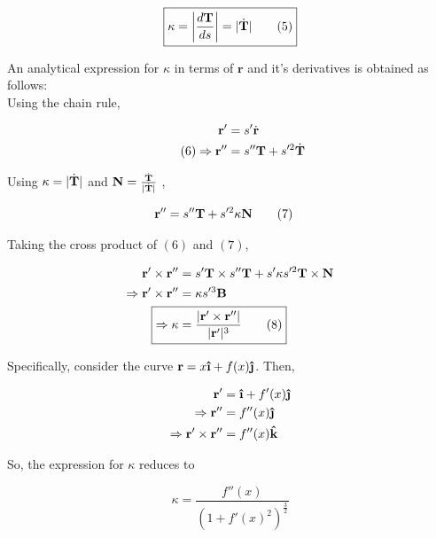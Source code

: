 \documentclass{article}
\begin{document}
\begin{flushleft}
     \begin{equation*}
     \boxed{\kappa = \displaystyle\left\lvert \frac{d\mathbf{T}}{ds} \right\rvert = \lvert \dot{\mathbf{T}} \rvert \tag{5}}
     \end{equation*}
     
     An analytical expression for $\kappa$ in terms of $\mathbf{r}$ and it's derivatives is obtained as follows:\\
     Using the chain rule, 
     
     \begin{align*}    
	\mathbf{r'} &= s'\dot{\mathbf{r}}\\\tag{6}
	\Rightarrow \mathbf{r''} &= s''\mathbf{T}+s'^{2}\dot{\mathbf{T}}
     \end{align*}
     
     Using $\kappa= \lvert \dot{\mathbf{T}} \rvert$ and $\mathbf{N} = \frac{\dot{\mathbf{T}}}{ \lvert \dot{\mathbf{T}} \rvert}$
     ,
     
     \begin{align*}
     \mathbf{r''} &= s''\mathbf{T}+s'^{2}\kappa\mathbf{N}\tag{7}
     \end{align*}
     
     Taking the cross product of $(6)$ and $(7)$,
     
     \begin{align*}
     \vect{r'} \times \vect{r''} &= s'\mathbf{T} \times s''\vect{T} + s' \kappa s'^{2}\vect{T} \times \vect{N}\\
     \Rightarrow \vect{r'} \times \vect{r''} &= \kappa s'^{3} \vect{B}\\
     \Aboxed{\Rightarrow \kappa &= \frac{\Mod{\vect{r'} \times \vect{r''}}}{\Mod{\vect{r'}}^{3}}\tag{8}}
     \end{align*}
     
     Specifically,  consider the curve $ \vect{r} = x\uveci + f(x)\uvecj$. Then,  
     
     \begin{align*}
     \vect{r'} & = \uveci + f'(x)\uvecj \\
     \Rightarrow \vect{r''} &= f''(x)\uvecj \\
     \Rightarrow \vect{r'} \times \vect{r''} &= f''(x)\uveck
     \end{align*}
     
     So,  the expression for $\kappa$ reduces to 
     
     \begin{equation*}
     \boxed{\kappa = \frac{f''(x)}{(1 + f'(x)^{2})^{\frac{3}{2}}}}
     \end{equation*}
     

\end{flushleft}
\end{document}
